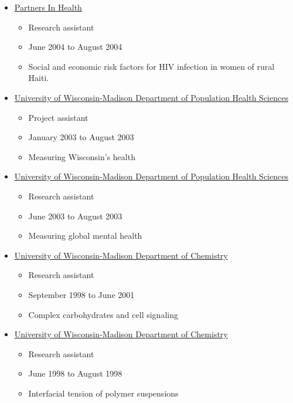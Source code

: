 \begin{itemize}
  \item \href{http://www.pih.org}{Partners In Health}
  \begin{itemize}
    \item Research assistant    
    \item June 2004 to August 2004    
    \item Social and economic risk factors for HIV infection in women of rural Haiti.
  \end{itemize}


  \item \href{http://www.pophealth.wisc.edu}{University of Wisconsin-Madison Department of Population Health Sciences}
  \begin{itemize}
    \item Project assistant    
    \item January 2003 to August 2003    
    \item Measuring Wisconsin's health    
  \end{itemize}

  \item \href{http://www.pophealth.wisc.edu}{University of Wisconsin-Madison Department of Population Health Sciences}
  \begin{itemize}
    \item Research assistant    
    \item June 2003 to August 2003    
    \item Measuring global mental health    
  \end{itemize}

  \item \href{http://www.chem.wisc.edu}{University of Wisconsin-Madison Department of Chemistry}
  \begin{itemize}
    \item Research assistant
    \item September 1998 to June 2001
    \item Complex carbohydrates and cell signaling
  \end{itemize}
  
  \item \href{http://www.chem.wisc.edu}{University of Wisconsin-Madison Department of Chemistry}
  \begin{itemize}
    \item Research assistant
    \item June 1998 to August 1998
    \item Interfacial tension of polymer suspensions
  \end{itemize}
  

\end{itemize}
